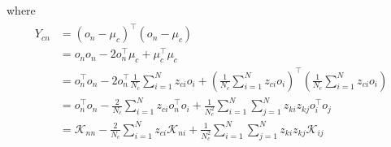 \documentclass[natbib,smallextended]{svjour3}
\providecommand{\DIFaddbegin}{} %
\providecommand{\DIFaddend}{} %
\providecommand{\DIFdelbegin}{} %
\providecommand{\DIFdelend}{} %
\begin{document}
where
\begin{align}
\DIFdelbegin %
\DIFdelend \DIFaddbegin \begin{split}
Y_{cn} & =  \left(o_n-\mu_c\right)^\top\left(o_n-\mu_c\right) \\
       & =  o_no_n - 2 o_n^\top \mu_c + \mu_c^\top \mu_c \\
       & =  o_n^\top o_n - 2 o_n^\top \frac{1}{N_c} \sum_{i=1}^{N} z_{ci} o_i +
       	 \left(\frac{1}{N_c} \sum_{i=1}^{N} z_{ci} o_i\right)^\top
         \left(\frac{1}{N_c} \sum_{i=1}^{N} z_{ci} o_i\right)\\
       & =  o_n^\top o_n - \frac{2}{N_c} \sum_{i=1}^{N} z_{ci} o_n^\top o_i +
       	 \frac{1}{N_c^2} \sum_{i=1}^{N} \sum_{j=1}^{N} z_{ki} z_{kj} o_i^\top o_j \\
       & =  \mathcal{K}_{nn} - \frac{2}{N_c} \sum_{i=1}^{N} z_{ci} \mathcal{K}_{ni} +
         \frac{1}{N_c^2} \sum_{i=1}^{N} \sum_{j=1}^{N} z_{ki} z_{kj} \mathcal{K}_{ij} \label{eq:yki}
\end{split}
\DIFaddend \end{align}
\end{document}
